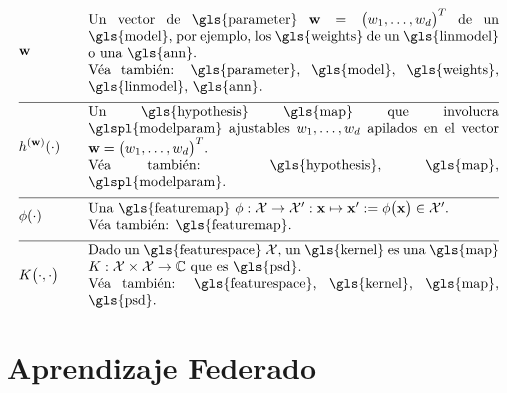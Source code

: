 \begin{align} 
	&\weights  &\quad & \parbox{.85\textwidth}{Un vector de \gls{parameter} $\weights = \big(\weight_{1}, \ldots, \weight_{\featuredim}\big)^{T}$ 
		de un \gls{model}, por ejemplo, los \gls{weights} de un \gls{linmodel} o una \gls{ann}.
		\\ Véa también: \gls{parameter}, \gls{model}, \gls{weights}, \gls{linmodel}, \gls{ann}.} \nonumber \\[2mm] \hline \nonumber\\[-5mm]
	&\hypothesis^{(\weights)}(\cdot)  &\quad &\parbox{.85\textwidth}{Un \gls{hypothesis} \gls{map} que involucra \glspl{modelparam} ajustables 
		$\weight_{1}, \ldots, \weight_{\featuredim}$ apilados en el vector $\weights=\big(\weight_{1}, \ldots, \weight_{\featuredim} \big)^{T}$.
		\\ Véa también: \gls{hypothesis}, \gls{map}, \glspl{modelparam}.} \nonumber \\[2mm] \hline \nonumber\\[-5mm]
	&\featuremap(\cdot)  &\quad & \parbox{.85\textwidth}{Una \gls{featuremap} 
		$\featuremap: \featurespace \rightarrow \featurespace' : \featurevec \mapsto \featurevec' \defeq \featuremap\big( \featurevec \big) \in \featurespace'$.
		\\ Véa también: \gls{featuremap}.} \nonumber \\[2mm] \hline \nonumber\\[-5mm]
	&\kernelmap{\cdot}{\cdot} &\quad & \parbox{.85\textwidth}{Dado un \gls{featurespace} $\featurespace$, 
		un \gls{kernel} es una \gls{map} $\kernel: \featurespace \times \featurespace \rightarrow \mathbb{C}$ que es \gls{psd}.
		\\ Véa también: \gls{featurespace}, \gls{kernel}, \gls{map}, \gls{psd}.} \nonumber 
\end{align}





\newpage
\section*{Aprendizaje Federado}

